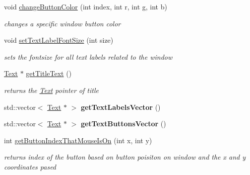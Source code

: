 \begin{DoxyCompactItemize}
void \hyperlink{class_text_based_window_a9a63ff592b3a31e6cf5db15b0e10656c}{change\+Button\+Color} (int index, int r, int g, int b)
\begin{DoxyCompactList}\small\item\em changes a specific window button color \end{DoxyCompactList}\item 
\hypertarget{class_text_based_window_a7354bc5aca3bd79777421ebe413c16b0}{}\label{class_text_based_window_a7354bc5aca3bd79777421ebe413c16b0} 
void \hyperlink{class_text_based_window_a7354bc5aca3bd79777421ebe413c16b0}{set\+Text\+Label\+Font\+Size} (int size)
\begin{DoxyCompactList}\small\item\em sets the fontsize for all text labels related to the window \end{DoxyCompactList}\item 
\hypertarget{class_text_based_window_ab65f222dce6fdaba84e1e43499ef30c6}{}\label{class_text_based_window_ab65f222dce6fdaba84e1e43499ef30c6} 
\hyperlink{class_text}{Text} $\ast$ \hyperlink{class_text_based_window_ab65f222dce6fdaba84e1e43499ef30c6}{get\+Title\+Text} ()
\begin{DoxyCompactList}\small\item\em returns the \hyperlink{class_text}{Text} pointer of title \end{DoxyCompactList}\item 
\hypertarget{class_text_based_window_a8461c4109986c5dd0f162b9c68f0ba11}{}\label{class_text_based_window_a8461c4109986c5dd0f162b9c68f0ba11} 
std\+::vector$<$ \hyperlink{class_text}{Text} $\ast$ $>$ {\bfseries get\+Text\+Labels\+Vector} ()
\item 
\hypertarget{class_text_based_window_a635b57792c403406ab4b9237e14efa47}{}\label{class_text_based_window_a635b57792c403406ab4b9237e14efa47} 
std\+::vector$<$ \hyperlink{class_text}{Text} $\ast$ $>$ {\bfseries get\+Text\+Buttons\+Vector} ()
\item 
\hypertarget{class_text_based_window_a8e1efbb01b046b4fa93afe796aefc86b}{}\label{class_text_based_window_a8e1efbb01b046b4fa93afe796aefc86b} 
int \hyperlink{class_text_based_window_a8e1efbb01b046b4fa93afe796aefc86b}{get\+Button\+Index\+That\+Mouse\+Is\+On} (int x, int y)
\begin{DoxyCompactList}\small\item\em returns index of the button based on button poisiton on window and the x and y coordinates pased \end{DoxyCompactList}\item 

\end{DoxyCompactItemize}
